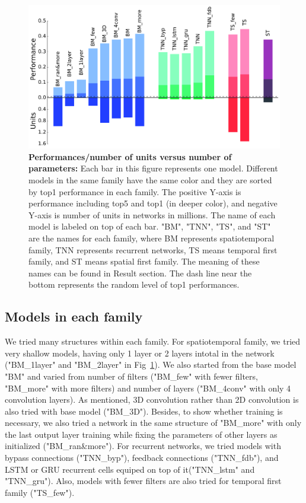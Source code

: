 \begin{figure}[h]
\includegraphics [width=1\linewidth]{figures/main.pdf}
\vspace{-2mm}
\caption{\textbf{Performances/number of units versus number of parameters:} Each bar in this figure represents one model. Different models in the same family have the same color and they are sorted by top1 performance in each family. The positive Y-axis is performance including top5 and top1 (in deeper color), and negative Y-axis is number of units in networks in millions. The name of each model is labeled on top of each bar. "BM", "TNN", "TS", and "ST" are the names for each family, where BM represents spatiotemporal family, TNN represents recurrent networks, TS means temporal first family, and ST means spatial first family. The meaning of these names can be found in Result section. The dash line near the bottom represents the random level of top1 performances.~\label{fig_main}}
\end{figure}

\subsection{Models in each family}

We tried many structures within each family. 
For spatiotemporal family, we tried very shallow models, having only 1 layer or 2 layers intotal in the network ("BM\_1layer" and "BM\_2layer" in Fig~\ref{fig_main}). 
We also started from the base model "BM" and varied from number of filters ("BM\_few" with fewer filters, "BM\_more" with more filters) and number of layers ("BM\_4conv" with only 4 convolution layers).
As mentioned, 3D convolution rather than 2D convolution is also tried with base model ("BM\_3D").
Besides, to show whether training is necessary, we also tried a network in the same structure of "BM\_more" with only the last output layer training while fixing the parameters of other layers as initialized ("BM\_ran\&more").
For recurrent networks, we tried models with bypass connections ("TNN\_byp"), feedback connections ("TNN\_fdb"), and LSTM or GRU recurrent cells equiped on top of it("TNN\_lstm" and "TNN\_gru").
Also, models with fewer filters are also tried for temporal first family ("TS\_few").

